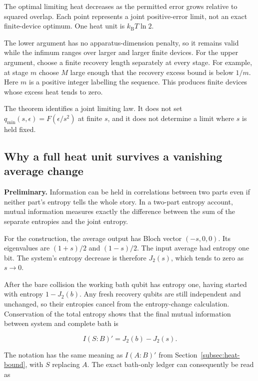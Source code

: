 \documentclass[11pt,letterpaper]{article}
\begin{document}
The optimal limiting heat decreases as the permitted error grows relative to squared overlap. Each point represents a joint positive-error limit, not an exact finite-device optimum. One heat unit is \(k_{\mathrm{B}}T\ln 2\).

The lower argument has no apparatus-dimension penalty, so it remains valid while the infimum ranges over larger and larger finite devices. For the upper argument, choose a finite recovery length separately at every stage. For example, at stage \(m\) choose \(M\) large enough that the recovery excess bound is below \(1/m\). Here \(m\) is a positive integer labelling the sequence. This produces finite devices whose excess heat tends to zero.

The theorem identifies a joint limiting law. It does not set \(q_{\min}(s,\epsilon) = F\left( \epsilon/s^{2} \right)\) at finite \(s\), and it does not determine a limit where \(s\) is held fixed.

\clearpage
\subsection{Why a full heat unit survives a vanishing average change}\label{subsec:surviving-heat}

\textbf{Preliminary.} Information can be held in correlations between two parts even if neither part's entropy tells the whole story. In a two-part entropy account, mutual information measures exactly the difference between the sum of the separate entropies and the joint entropy.

For the construction, the average output has Bloch vector \(( - s,0,0)\). Its eigenvalues are \((1 + s)/2\) and \((1 - s)/2\). The input average had entropy one bit. The system's entropy decrease is therefore \(J_{2}(s)\), which tends to zero as \(s \rightarrow 0\).

After the bare collision the working bath qubit has entropy one, having started with entropy \(1 - J_{2}(b)\). Any fresh recovery qubits are still independent and unchanged, so their entropies cancel from the entropy-change calculation. Conservation of the total entropy shows that the final mutual information between system and complete bath is

\[I(S{:}B)' = J_{2}(b) - J_{2}(s).\]

The notation has the same meaning as \(I(A{:}B)'\) from Section~\ref{subsec:heat-bound}, with \(S\) replacing \(A\). The exact bath-only ledger can consequently be read as
\end{document}
